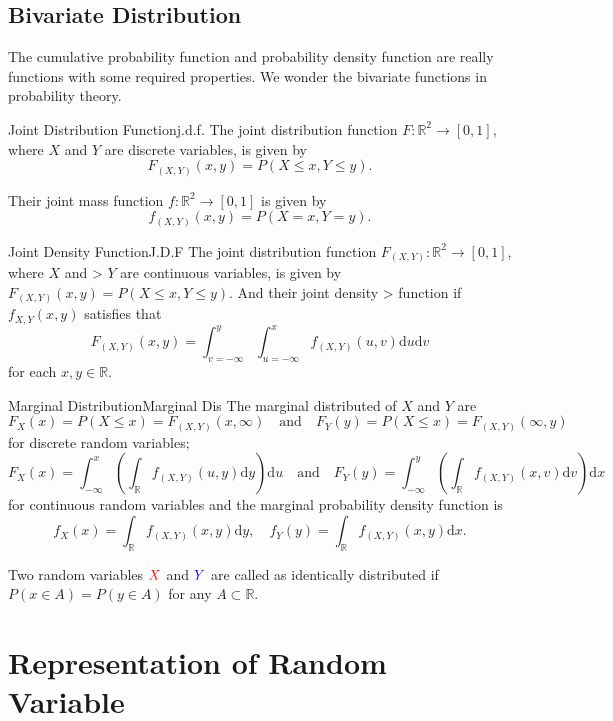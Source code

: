 \documentclass[titlestyle=hang,11pt]{elegantbook}
\begin{document}
\subsection{Bivariate Distribution}

The cumulative probability function and probability density function are really functions with some required properties. We wonder the bivariate functions in probability theory.
\begin{definition}{Joint Distribution Function}{j.d.f.}
The joint distribution function $F:\mathbb{R}^{2}\rightarrow [0,1]$, where $X$ and $Y$ are discrete variables, is given by
\[ F_{(X,Y)}(x,y)=P(X\leq x, Y\leq y). \]
\end{definition}
Their joint mass function  $f:\mathbb{R}^{2}\rightarrow [0,1]$ is given by
\[ f_{(X,Y)}(x,y)=P(X=x, Y=y). \]

\begin{definition}{Joint Density  Function}{J.D.F}
The joint distribution function $F_{(X,Y)}:\mathbb{R}^{2}\rightarrow [0,1]$, where $X$ and > $Y$ are continuous variables, is given by $F_{(X,Y)}(x,y)=P(X\leq x, Y\leq y)$. And their joint density > function if  $f_{X,Y}(x, y)$ satisfies that
\[ F_{(X,Y)}(x,y)=\int_{v=-\infty}^{y}\int_{u=-\infty}^{x}f_{(X,Y)}(u,v)\mathrm{d}u\mathrm{d}v \]
for each $x,y \in \mathbb{R}$.
\end{definition}


\begin{definition}{Marginal Distribution}{Marginal Dis}
The marginal distributed of $X$ and $Y$ are
\[ F_X(x)=P(X\leq x)=F_{(X,Y)}(x,\infty)\quad\text{and}\quad F_Y(y)=P(X\leq x)=F_{(X,Y)}  (\infty, y) \]
for discrete random variables;
\[ F_X(x)=\int_{-\infty}^{x}(\int_{\mathbb{R}}f_{(X,Y)}(u, y)\mathrm{d}y)\mathrm{d}u \quad\text{and}\quad  F_Y(y)=\int_{-\infty}^{y}(\int_{\mathbb{R}}f_{(X,Y)}(x,v)\mathrm{d}v)\mathrm{d}x \]
for continuous random variables and the marginal probability density function is
\[ f_X(x)=\int_{\mathbb{R}}f_{(X,Y)}(x, y)\mathrm{d}y,\quad f_Y(y)=\int_{\mathbb{R}}f_{(X,Y)}(x, y)\mathrm{d}x.\]
\end{definition}

Two random variables $\color{red}{X}$ and $\color{blue}{Y}$ are called as identically distributed if $P(x\in A)=P(y\in A)$ for any $A \subset \mathbb{R}$.

\section{Representation of Random Variable}
\end{document}
